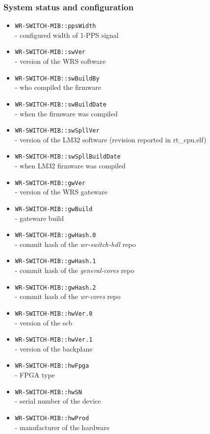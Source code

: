 \subsubsection{System status and configuration}
\begin{itemize}[leftmargin=0pt]
	\item [] \texttt{WR-SWITCH-MIB::ppsWidth}\\ - configured width of 1-PPS signal
	\item [] \texttt{WR-SWITCH-MIB::swVer}\\ - version of the WRS software
	\item [] \texttt{WR-SWITCH-MIB::swBuildBy}\\ - who compiled the firmware
	\item [] \texttt{WR-SWITCH-MIB::swBuildDate}\\ - when the firmware was
		compiled
	\item [] \texttt{WR-SWITCH-MIB::swSpllVer}\\ - version of the LM32 software
		(revision reported in rt\_cpu.elf)
	\item [] \texttt{WR-SWITCH-MIB::swSpllBuildDate}\\ - when LM32 firmware was
		compiled
	\item [] \texttt{WR-SWITCH-MIB::gwVer}\\ - version of the WRS gateware
	\item [] \texttt{WR-SWITCH-MIB::gwBuild}\\ - gateware build
	\item [] \texttt{WR-SWITCH-MIB::gwHash.0}\\ - commit hash of the
		\emph{wr-switch-hdl} repo
	\item [] \texttt{WR-SWITCH-MIB::gwHash.1}\\ - commit hash of the
		\emph{general-cores} repo
	\item [] \texttt{WR-SWITCH-MIB::gwHash.2}\\ - commit hash of the
		\emph{wr-cores} repo
	\item [] \texttt{WR-SWITCH-MIB::hwVer.0}\\ - version of the scb
	\item [] \texttt{WR-SWITCH-MIB::hwVer.1}\\ - version of the backplane
	\item [] \texttt{WR-SWITCH-MIB::hwFpga}\\ - FPGA type
	\item [] \texttt{WR-SWITCH-MIB::hwSN}\\ - serial number of the device
	\item [] \texttt{WR-SWITCH-MIB::hwProd}\\ - manufacturer of the hardware


\end{itemize}
